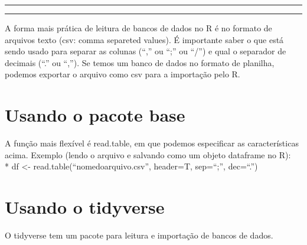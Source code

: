 \documentclass[
  letterpaper,
  DIV=11,
  numbers=noendperiod]{scrreprt}
\begin{document}
\begin{center}\rule{0.5\linewidth}{0.5pt}\end{center}

\begin{center}\rule{0.5\linewidth}{0.5pt}\end{center}

A forma mais prática de leitura de bancos de dados no R é no formato de
arquivos texto (csv: comma separeted values). É importante saber o que
está sendo usado para separar as colunas (``,'' ou ``;'' ou ``/'') e
qual o separador de decimais (``.'' ou ``,''). Se temos um banco de
dados no formato de planilha, podemos exportar o arquivo como csv para a
importação pelo R.

\section{Usando o pacote base}\label{usando-o-pacote-base}

A função mais flexível é read.table, em que podemos especificar as
características acima. Exemplo (lendo o arquivo e salvando como um
objeto dataframe no R):\\
* df \textless- read.table(``nomedoarquivo.csv'', header=T, sep=``;'',
dec=``.'')

\section{Usando o tidyverse}\label{usando-o-tidyverse}

O tidyverse tem um pacote para leitura e importação de bancos de dados.
\end{document}
